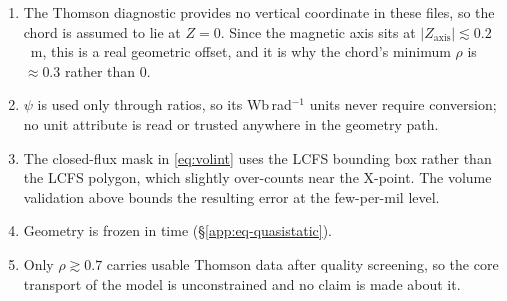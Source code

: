 \begin{enumerate}
\item The Thomson diagnostic provides no vertical coordinate in these
      files, so the chord is assumed to lie at $Z = 0$. Since the magnetic
      axis sits at $|Z_{\mathrm{axis}}| \lesssim 0.2$~m, this is a real
      geometric offset, and it is why the chord's minimum $\rho$ is
      $\approx 0.3$ rather than $0$.
\item $\psi$ is used only through ratios, so its Wb\,rad$^{-1}$ units never
      require conversion; no unit attribute is read or trusted anywhere in
      the geometry path.
\item The closed-flux mask in \eqref{eq:volint} uses the LCFS bounding box
      rather than the LCFS polygon, which slightly over-counts near the
      X-point. The volume validation above bounds the resulting error at
      the few-per-mil level.
\item Geometry is frozen in time (\S\ref{app:eq-quasistatic}).
\item Only $\rho \gtrsim 0.7$ carries usable Thomson data after quality
      screening, so the core transport of the model is unconstrained and no
      claim is made about it.
\end{enumerate}
